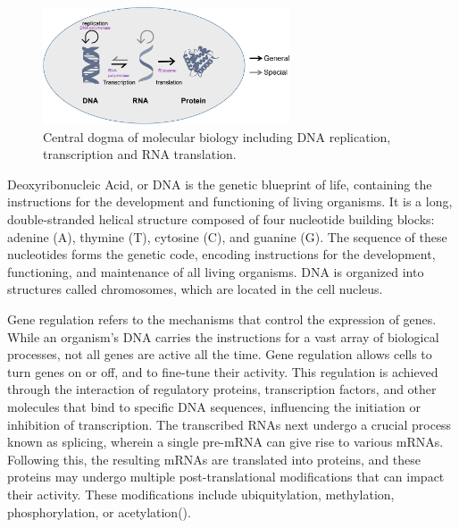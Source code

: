\begin{figure}[!ht]
	\centering
	\includegraphics[width=0.65\textwidth]{central_dogma/fig}
	\vspace{0.1cm}
	\caption[central dogma.]{Central dogma of molecular biology including DNA replication, transcription and RNA translation.} 
	\label{fig:central_dogma}
\end{figure}

Deoxyribonucleic Acid, or DNA is the genetic blueprint of life, containing the instructions for the development and functioning of living organisms. It is a long, double-stranded helical structure composed of four nucleotide building blocks: adenine (A), thymine (T), cytosine (C), and guanine (G). The sequence of these nucleotides forms the genetic code, encoding instructions for the development, functioning, and maintenance of all living organisms. DNA is organized into structures called chromosomes, which are located in the cell nucleus. 



Gene regulation refers to the mechanisms that control the expression of genes. While an organism's DNA carries the instructions for a vast array of biological processes, not all genes are active all the time. Gene regulation allows cells to turn genes on or off, and to fine-tune their activity. This regulation is achieved through the interaction of regulatory proteins, transcription factors, and other molecules that bind to specific DNA sequences, influencing the initiation or inhibition of transcription. The transcribed RNAs next undergo a crucial process known as splicing, wherein a single pre-mRNA can give rise to various mRNAs. Following this, the resulting mRNAs are translated into proteins, and these proteins may undergo multiple post-translational modifications that can impact their activity. These modifications include ubiquitylation, methylation, phosphorylation, or acetylation\citep{wang2014protein}().



